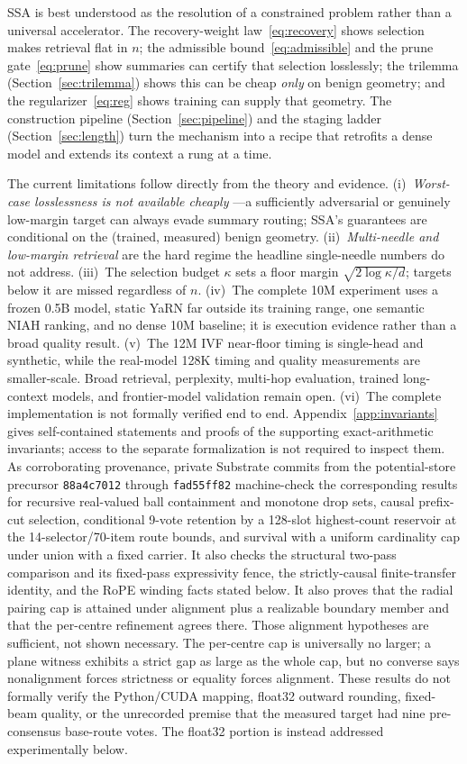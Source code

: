 \documentclass[11pt]{article}
\numberwithin{equation}{section}
\begin{document}
SSA is best understood as the resolution of a constrained problem rather than a universal accelerator. The
recovery-weight law~\eqref{eq:recovery} shows selection makes retrieval flat in $n$; the admissible
bound~\eqref{eq:admissible} and the prune gate~\eqref{eq:prune} show summaries can certify that selection
losslessly; the trilemma (Section~\ref{sec:trilemma}) shows this can be cheap \emph{only} on benign geometry;
and the regularizer~\eqref{eq:reg} shows training can supply that geometry. The construction pipeline
(Section~\ref{sec:pipeline}) and the staging ladder (Section~\ref{sec:length}) turn the mechanism into a recipe
that retrofits a dense model and extends its context a rung at a time.

The current limitations follow directly from the theory and evidence. (i)~\emph{Worst-case losslessness is not available cheaply}
---a sufficiently adversarial or genuinely low-margin target can always evade summary routing; SSA's guarantees
are conditional on the (trained, measured) benign geometry. (ii)~\emph{Multi-needle and low-margin retrieval}
are the hard regime the headline single-needle numbers do not address. (iii)~The selection budget $\kappa$ sets
a floor margin $\sqrt{2\log\kappa/d}$; targets below it are missed regardless of $n$. (iv)~The complete 10M
experiment uses a frozen 0.5B model, static YaRN far outside its training range, one semantic NIAH ranking,
and no dense 10M baseline; it is execution evidence rather than a broad quality result. (v)~The 12M IVF
near-floor timing is single-head and synthetic, while the real-model 128K timing and quality measurements are
smaller-scale. Broad retrieval, perplexity, multi-hop evaluation, trained long-context models, and
frontier-model validation remain open. (vi)~The complete implementation is not formally verified end to end.
Appendix~\ref{app:invariants} gives self-contained statements and proofs of the supporting exact-arithmetic
invariants; access to the separate formalization is not required to inspect them. As corroborating provenance,
private Substrate commits from the potential-store precursor \texttt{88a4c7012} through
\texttt{fad55ff82} machine-check the corresponding results for
recursive real-valued ball containment and monotone drop sets, causal prefix-cut selection, conditional
9-vote retention by a 128-slot highest-count reservoir at the 14-selector/70-item route bounds, and survival
with a uniform cardinality cap under union with a fixed carrier. It also checks the structural two-pass
comparison and its fixed-pass expressivity fence, the strictly-causal finite-transfer identity, and the RoPE
winding facts stated below.
It also proves that the radial pairing cap is attained under alignment plus a realizable boundary member and
that the per-centre refinement agrees there. Those alignment hypotheses are sufficient, not shown necessary.
The per-centre cap is universally no larger; a plane witness exhibits a strict gap as large as the whole cap,
but no converse says nonalignment forces strictness or equality forces alignment. These results do not
formally verify the Python/CUDA mapping, float32 outward rounding, fixed-beam quality, or the unrecorded
premise that the measured target had nine pre-consensus base-route votes. The float32 portion is instead
addressed experimentally below.
\end{document}
